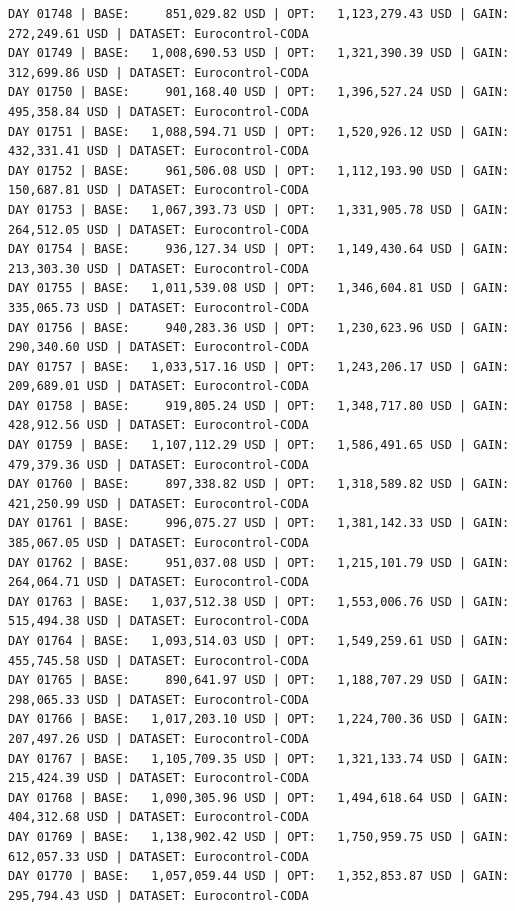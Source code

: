 \documentclass[11pt,a4paper]{article}
\begin{document}
\begin{verbatim}
DAY 01748 | BASE:     851,029.82 USD | OPT:   1,123,279.43 USD | GAIN: 272,249.61 USD | DATASET: Eurocontrol-CODA
DAY 01749 | BASE:   1,008,690.53 USD | OPT:   1,321,390.39 USD | GAIN: 312,699.86 USD | DATASET: Eurocontrol-CODA
DAY 01750 | BASE:     901,168.40 USD | OPT:   1,396,527.24 USD | GAIN: 495,358.84 USD | DATASET: Eurocontrol-CODA
DAY 01751 | BASE:   1,088,594.71 USD | OPT:   1,520,926.12 USD | GAIN: 432,331.41 USD | DATASET: Eurocontrol-CODA
DAY 01752 | BASE:     961,506.08 USD | OPT:   1,112,193.90 USD | GAIN: 150,687.81 USD | DATASET: Eurocontrol-CODA
DAY 01753 | BASE:   1,067,393.73 USD | OPT:   1,331,905.78 USD | GAIN: 264,512.05 USD | DATASET: Eurocontrol-CODA
DAY 01754 | BASE:     936,127.34 USD | OPT:   1,149,430.64 USD | GAIN: 213,303.30 USD | DATASET: Eurocontrol-CODA
DAY 01755 | BASE:   1,011,539.08 USD | OPT:   1,346,604.81 USD | GAIN: 335,065.73 USD | DATASET: Eurocontrol-CODA
DAY 01756 | BASE:     940,283.36 USD | OPT:   1,230,623.96 USD | GAIN: 290,340.60 USD | DATASET: Eurocontrol-CODA
DAY 01757 | BASE:   1,033,517.16 USD | OPT:   1,243,206.17 USD | GAIN: 209,689.01 USD | DATASET: Eurocontrol-CODA
DAY 01758 | BASE:     919,805.24 USD | OPT:   1,348,717.80 USD | GAIN: 428,912.56 USD | DATASET: Eurocontrol-CODA
DAY 01759 | BASE:   1,107,112.29 USD | OPT:   1,586,491.65 USD | GAIN: 479,379.36 USD | DATASET: Eurocontrol-CODA
DAY 01760 | BASE:     897,338.82 USD | OPT:   1,318,589.82 USD | GAIN: 421,250.99 USD | DATASET: Eurocontrol-CODA
DAY 01761 | BASE:     996,075.27 USD | OPT:   1,381,142.33 USD | GAIN: 385,067.05 USD | DATASET: Eurocontrol-CODA
DAY 01762 | BASE:     951,037.08 USD | OPT:   1,215,101.79 USD | GAIN: 264,064.71 USD | DATASET: Eurocontrol-CODA
DAY 01763 | BASE:   1,037,512.38 USD | OPT:   1,553,006.76 USD | GAIN: 515,494.38 USD | DATASET: Eurocontrol-CODA
DAY 01764 | BASE:   1,093,514.03 USD | OPT:   1,549,259.61 USD | GAIN: 455,745.58 USD | DATASET: Eurocontrol-CODA
DAY 01765 | BASE:     890,641.97 USD | OPT:   1,188,707.29 USD | GAIN: 298,065.33 USD | DATASET: Eurocontrol-CODA
DAY 01766 | BASE:   1,017,203.10 USD | OPT:   1,224,700.36 USD | GAIN: 207,497.26 USD | DATASET: Eurocontrol-CODA
DAY 01767 | BASE:   1,105,709.35 USD | OPT:   1,321,133.74 USD | GAIN: 215,424.39 USD | DATASET: Eurocontrol-CODA
DAY 01768 | BASE:   1,090,305.96 USD | OPT:   1,494,618.64 USD | GAIN: 404,312.68 USD | DATASET: Eurocontrol-CODA
DAY 01769 | BASE:   1,138,902.42 USD | OPT:   1,750,959.75 USD | GAIN: 612,057.33 USD | DATASET: Eurocontrol-CODA
DAY 01770 | BASE:   1,057,059.44 USD | OPT:   1,352,853.87 USD | GAIN: 295,794.43 USD | DATASET: Eurocontrol-CODA

\end{verbatim}
\end{document}
